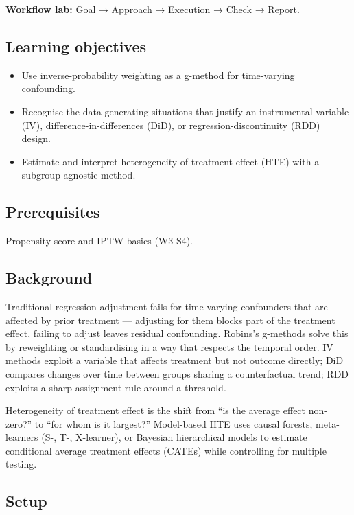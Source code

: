 \documentclass[
]{article}
\author{}
\date{\vspace{-2.5em}}
\providecommand{\tightlist}{%
  \setlength{\itemsep}{0pt}\setlength{\parskip}{0pt}}
\begin{document}
\textbf{Workflow lab:} Goal → Approach → Execution → Check → Report.

\subsection{Learning objectives}\label{learning-objectives}

\begin{itemize}
\tightlist
\item
  Use inverse-probability weighting as a g-method for time-varying
  confounding.
\item
  Recognise the data-generating situations that justify an
  instrumental-variable (IV), difference-in-differences (DiD), or
  regression-discontinuity (RDD) design.
\item
  Estimate and interpret heterogeneity of treatment effect (HTE) with a
  subgroup-agnostic method.
\end{itemize}

\subsection{Prerequisites}\label{prerequisites}

Propensity-score and IPTW basics (W3 S4).

\subsection{Background}\label{background}

Traditional regression adjustment fails for time-varying confounders
that are affected by prior treatment --- adjusting for them blocks part
of the treatment effect, failing to adjust leaves residual confounding.
Robins's g-methods solve this by reweighting or standardising in a way
that respects the temporal order. IV methods exploit a variable that
affects treatment but not outcome directly; DiD compares changes over
time between groups sharing a counterfactual trend; RDD exploits a sharp
assignment rule around a threshold.

Heterogeneity of treatment effect is the shift from ``is the average
effect non-zero?'' to ``for whom is it largest?'' Model-based HTE uses
causal forests, meta-learners (S-, T-, X-learner), or Bayesian
hierarchical models to estimate conditional average treatment effects
(CATEs) while controlling for multiple testing.

\subsection{Setup}\label{setup}
\end{document}
